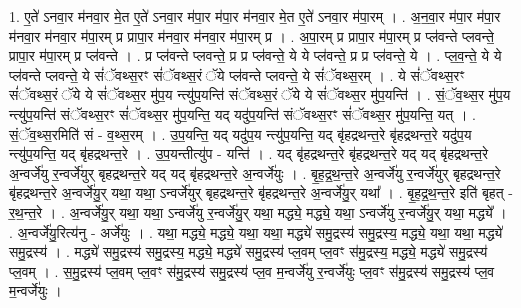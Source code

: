 \documentclass[17pt]{extarticle}
\begin{document}
1. ए॒ते॑ ऽनवा॒र म॑नवा॒र मे॒त ए॒ते॑ ऽनवा॒र म॑पा॒र म॑पा॒र म॑नवा॒र मे॒त ए॒ते॑ ऽनवा॒र म॑पा॒रम् । . अ॒न॒वा॒र म॑पा॒र म॑पा॒र म॑नवा॒र म॑नवा॒र म॑पा॒रम् प्र प्रापा॒र म॑नवा॒र म॑नवा॒र म॑पा॒रम् प्र । . अ॒पा॒रम् प्र प्रापा॒र म॑पा॒रम् प्र प्ल॑वन्ते प्लवन्ते॒ प्रापा॒र म॑पा॒रम् प्र प्ल॑वन्ते । . प्र प्ल॑वन्ते प्लवन्ते॒ प्र प्र प्ल॑वन्ते॒ ये ये प्ल॑वन्ते॒ प्र प्र प्ल॑वन्ते॒ ये । . प्ल॒व॒न्ते॒ ये ये प्ल॑वन्ते प्लवन्ते॒ ये सं॑ॅवथ्स॒रꣳ सं॑ॅवथ्स॒रं ॅये प्ल॑वन्ते प्लवन्ते॒ ये सं॑ॅवथ्स॒रम् । . ये सं॑ॅवथ्स॒रꣳ सं॑ॅवथ्स॒रं ॅये ये सं॑ॅवथ्स॒र मु॑प॒य न्त्यु॑प॒यन्ति॑ संॅवथ्स॒रं ॅये ये सं॑ॅवथ्स॒र मु॑प॒यन्ति॑ । . सं॒ॅव॒थ्स॒र मु॑प॒य न्त्यु॑प॒यन्ति॑ संॅवथ्स॒रꣳ सं॑ॅवथ्स॒र मु॑प॒यन्ति॒ यद् यदु॑प॒यन्ति॑ संॅवथ्स॒रꣳ सं॑ॅवथ्स॒र मु॑प॒यन्ति॒ यत् । . सं॒ॅव॒थ्स॒रमिति॑ सं - व॒थ्स॒रम् । . उ॒प॒यन्ति॒ यद् यदु॑प॒य न्त्यु॑प॒यन्ति॒ यद् बृ॑हद्रथन्त॒रे बृ॑हद्रथन्त॒रे यदु॑प॒य न्त्यु॑प॒यन्ति॒ यद् बृ॑हद्रथन्त॒रे । . उ॒प॒यन्तीत्यु॑प - यन्ति॑ । . यद् बृ॑हद्रथन्त॒रे बृ॑हद्रथन्त॒रे यद् यद् बृ॑हद्रथन्त॒रे अ॒न्वर्जे॑यु र॒न्वर्जे॑युर् बृहद्रथन्त॒रे यद् यद् बृ॑हद्रथन्त॒रे अ॒न्वर्जे॑युः । . बृ॒ह॒द्र॒थ॒न्त॒रे अ॒न्वर्जे॑यु र॒न्वर्जे॑युर् बृहद्रथन्त॒रे बृ॑हद्रथन्त॒रे अ॒न्वर्जे॑यु॒र् यथा॒ यथा॒ ऽन्वर्जे॑युर् बृहद्रथन्त॒रे बृ॑हद्रथन्त॒रे अ॒न्वर्जे॑यु॒र् यथा᳚ । . बृ॒ह॒द्र॒थ॒न्त॒रे इति॑ बृहत् - र॒थ॒न्त॒रे । . अ॒न्वर्जे॑यु॒र् यथा॒ यथा॒ ऽन्वर्जे॑यु र॒न्वर्जे॑यु॒र् यथा॒ मद्ध्ये॒ मद्ध्ये॒ यथा॒ ऽन्वर्जे॑यु र॒न्वर्जे॑यु॒र् यथा॒ मद्ध्ये᳚ । . अ॒न्वर्जे॑यु॒रित्य॑नु - अर्जे॑युः । . यथा॒ मद्ध्ये॒ मद्ध्ये॒ यथा॒ यथा॒ मद्ध्ये॑ समु॒द्रस्य॑ समु॒द्रस्य॒ मद्ध्ये॒ यथा॒ यथा॒ मद्ध्ये॑ समु॒द्रस्य॑ । . मद्ध्ये॑ समु॒द्रस्य॑ समु॒द्रस्य॒ मद्ध्ये॒ मद्ध्ये॑ समु॒द्रस्य॑ प्ल॒वम् प्ल॒वꣳ स॑मु॒द्रस्य॒ मद्ध्ये॒ मद्ध्ये॑ समु॒द्रस्य॑ प्ल॒वम् । . स॒मु॒द्रस्य॑ प्ल॒वम् प्ल॒वꣳ स॑मु॒द्रस्य॑ समु॒द्रस्य॑ प्ल॒व म॒न्वर्जे॑यु र॒न्वर्जे॑युः प्ल॒वꣳ स॑मु॒द्रस्य॑ समु॒द्रस्य॑ प्ल॒व म॒न्वर्जे॑युः । \newline
\end{document}
